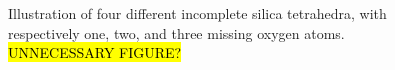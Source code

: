\begin{figure}[htpb]
\begin{subfigure}[b]{0.24\textwidth}
        \caption{}%
    \end{subfigure}%
    \caption{%
        Illustration of four different incomplete silica tetrahedra, with respectively one, two, and three missing oxygen atoms. \hl{UNNECESSARY FIGURE?}
    }%
    \label{fig:passivation}%
\end{figure}%






